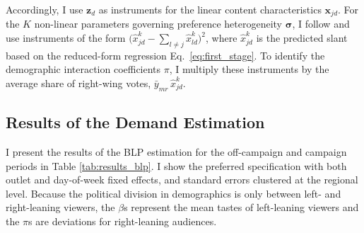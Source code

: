 \documentclass[12pt]{article}
\begin{document}
	
		
	
	Accordingly, I use
	$\bm{z}_{d}$
	as instruments for the linear content characteristics $ \bm{x}_{jd}$.  For the $K$ non-linear parameters governing preference heterogeneity $ \bm{\sigma}$, I follow \citet{gandhi2019measuring} and use instruments of the form 
	$\bigl(\hat{x}_{jd}^k-\sum_{l\neq j}\hat{x}_{ld}^k\bigr)^2$,
	where $\hat{x}_{jd}^k$ is the predicted slant based on the reduced-form regression Eq.~\eqref{eq:first_stage}. 	To identify the demographic interaction coefficients $\pi$, I multiply these instruments by the average share of right-wing votes, $\bar y_{mr}\,\hat{x}_{jd}^k$.



	\subsection{Results of the Demand Estimation}
	
	\label{sec:results}
	
	
I present the results of the BLP estimation for the off-campaign and campaign periods in Table \ref{tab:results_blp}. I show the preferred specification with both outlet and day-of-week fixed effects, and standard errors clustered at the regional level. Because the political division in demographics is only between left- and right-leaning viewers, the \(\beta\)s represent the mean tastes of left-leaning viewers and the \(\pi\)s are deviations for right-leaning audiences.
\end{document}
